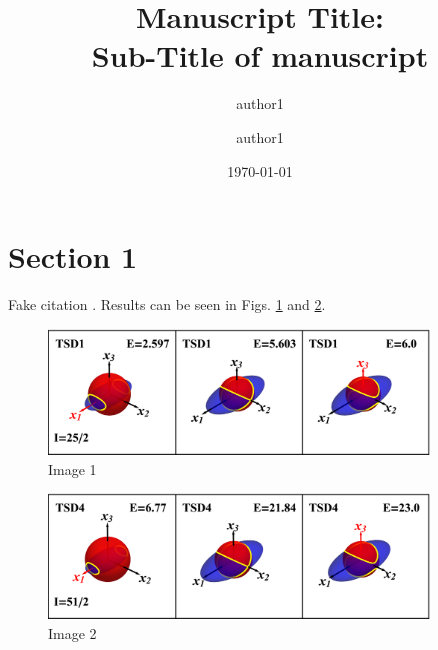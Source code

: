 \documentclass[%
 reprint,
 amsmath,
 amssymb,
 aps,
]{revtex4-2}
\begin{document}
\title{Manuscript Title:\\Sub-Title of manuscript }%

\author{author1}%
\author{author1}%
%


\date{\today}

\begin{abstract}
\lipsum[1]
\end{abstract}

\maketitle


\section{Section 1}

\lipsum[1-4] Fake citation \cite{chen2020interpretation}. Results can be seen in Figs. \ref{fig:image-1} and \ref{fig:image-2}.

\begin{figure}
    \centering
    \includegraphics[width=0.9\textwidth]{images/energy_ellipsoids/tsd1_spin1.eps}
    \caption{Image 1}
    \label{fig:image-1}
\end{figure}

\begin{figure}
    \centering
    \includegraphics[width=0.9\textwidth]{images/energy_ellipsoids/tsd4_spin2.eps}
    \caption{Image 2}
    \label{fig:image-2}
\end{figure}
\end{document}
